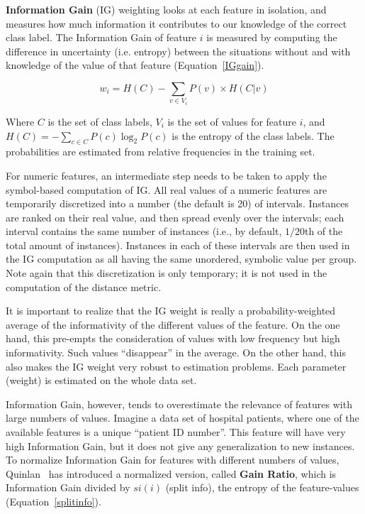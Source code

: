 \documentclass{report}
\begin{document}
{\bf Information Gain} (IG) weighting looks at each feature in
isolation, and measures how much information it contributes to our
knowledge of the correct class label. The Information Gain of feature
$i$ is measured by computing the difference in uncertainty
(i.e. entropy) between the situations without and with knowledge of
the value of that feature (Equation~\ref{IGgain}).

\begin{equation}
w_{i} = H(C) -  \sum_{v \in V_{i}} P(v) \times H(C|v)
\label{IGgain}
\end{equation}

Where $C$ is the set of class labels, $V_{i}$ is the set of values for
feature $i$, and $H(C) = - \sum_{c \in C} P(c) \log_{2} P(c)$ is the
entropy of the class labels. The probabilities are estimated from
relative frequencies in the training set. 

For numeric features, an intermediate step needs to be taken to apply
the symbol-based computation of IG. All real values of a numeric
features are temporarily discretized into a number (the default is 20)
of intervals. Instances are ranked on their real value, and then
spread evenly over the intervals; each interval contains the same
number of instances (i.e., by default, $1/20$th of the total amount of
instances). Instances in each of these intervals are then used in the
IG computation as all having the same unordered, symbolic value per
group. Note again that this discretization is only temporary; it is
not used in the computation of the distance metric.

It is important to realize that the IG weight is really a
probability-weighted average of the informativity of the different
values of the feature. On the one hand, this pre-empts the
consideration of values with low frequency but high
informativity. Such values ``disappear'' in the average. On the other
hand, this also makes the IG weight very robust to estimation
problems. Each parameter (weight) is estimated on the whole data set.

Information Gain, however, tends to overestimate the relevance of
features with large numbers of values. Imagine a data set of hospital
patients, where one of the available features is a unique ``patient ID
number''. This feature will have very high Information Gain, but it
does not give any generalization to new instances. To normalize
Information Gain for features with different numbers of values,
Quinlan~\cite{Quinlan93} has introduced a normalized version, called
{\bf Gain Ratio}, which is Information Gain divided by $si(i)$ (split info),
the entropy of the feature-values (Equation~\ref{splitinfo}).
\end{document}

